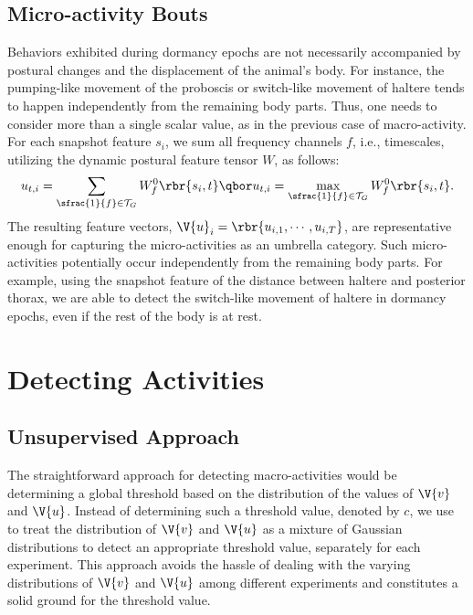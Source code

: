 \subsection{Micro-activity Bouts}\label{section:micro-activities}
Behaviors exhibited during dormancy epochs are not necessarily accompanied by postural changes and the displacement of the animal's body.
For instance, the pumping-like movement of the proboscis or switch-like movement of haltere tends to happen independently from the remaining body parts.
Thus, one needs to consider more than a single scalar value, as in the previous case of macro-activity.
For each snapshot feature $s_i$, we sum all frequency channels $f$, i.e., timescales, utilizing the dynamic postural feature tensor $W$, as follows:
\begin{equation}
	u_{t,i} = \sum_{\sfrac{1}{f} \in \mathcal{T}_G}{W_f^0\rbr{s_i,t}} \qbor
	u_{t,i} = \max_{\sfrac{1}{f} \in \mathcal{T}_G}{W_f^0\rbr{s_i,t}}.
\end{equation}
The resulting feature vectors, $\V{u}_i=\rbr{u_{i,1}, \cdots, u_{i,T}}$, are representative enough for capturing the micro-activities as an umbrella category.
Such micro-activities potentially occur independently from the remaining body parts.
For example, using the snapshot feature of the distance between haltere and posterior thorax, we are able to detect the switch-like movement of haltere in dormancy epochs, even if the rest of the body is at rest.

\section{Detecting Activities}\label{section:detecting-activities}
\subsection{Unsupervised Approach}\label{section:unsupervised-detection}
The straightforward approach for detecting macro-activities would be determining a global threshold based on the distribution of the values of $\V{v}$ and $\V{u}$.
Instead of determining such a threshold value, denoted by $c$, we use to treat the distribution of $\V{v}$ and $\V{u}$ as a mixture of Gaussian distributions to detect an appropriate threshold value, separately for each experiment.
This approach avoids the hassle of dealing with the varying distributions of $\V{v}$ and $\V{u}$ among different experiments and constitutes a solid ground for the threshold value.


